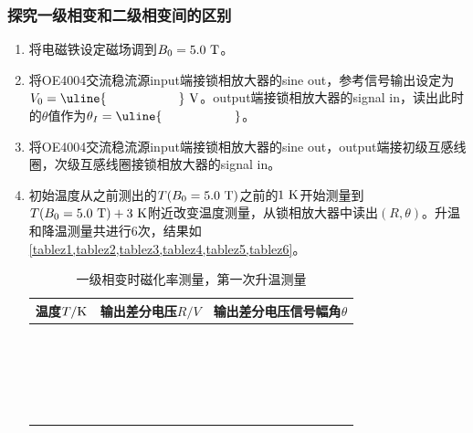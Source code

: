 \documentclass[11pt,a4paper]{ctexart}
\newcommand{\unit}[1]{\rm \ #1}
\begin{document}
\subsubsection{探究一级相变和二级相变间的区别}
  \begin{enumerate}
  \item
  将电磁铁设定磁场调到$B_0 = 5.0\unit{T}$。
  \item
   将OE4004交流稳流源input端接锁相放大器的sine out，参考信号输出设定为$V_0 = \uline{\hspace{20mm}}\unit{V}$。output端接锁相放大器的signal in，读出此时的$\theta$值作为$\theta_I = \uline{\hspace{20mm}}$。
  \item
  将OE4004交流稳流源input端接锁相放大器的sine out，output端接初级互感线圈，次级互感线圈接锁相放大器的signal in。
  \item
 初始温度从之前测出的$T(B_0=5.0\unit{T})$之前的$1\unit{K}$开始测量到$T(B_0=5.0\unit{T}) + 3\unit{K}$附近改变温度测量，从锁相放大器中读出$(R,\theta)$。升温和降温测量共进行6次，结果如\cref{tablez1,tablez2,tablez3,tablez4,tablez5,tablez6}。
  \begin{table}[H]
\centering
\caption{一级相变时磁化率测量，第一次升温测量\label{tablez1}}
\begin{tabular}{|p{32mm}|p{32mm}|p{32mm}|}
\hline
温度$T/{\rm K}$ & 输出差分电压$R/{V}$ & 输出差分电压信号幅角$\theta$ \\ \hline
 & & \\ \hline
  & & \\ \hline
  & & \\ \hline
   & & \\ \hline
    & & \\ \hline
 & & \\ \hline
  &  &\\ \hline
  &  &\\ \hline
  &  &\\ \hline
  &  &\\ \hline
  &  &\\ \hline
  &  &\\ \hline
  &  &\\ \hline
  &  &\\ \hline
  &  &\\ \hline
  &  &\\ \hline
  &  &\\ \hline
  &  &\\ \hline
    & &\\ \hline
  & &\\ \hline
   & &\\ \hline

\end{tabular}
\end{table}
\end{enumerate}
\end{document}

